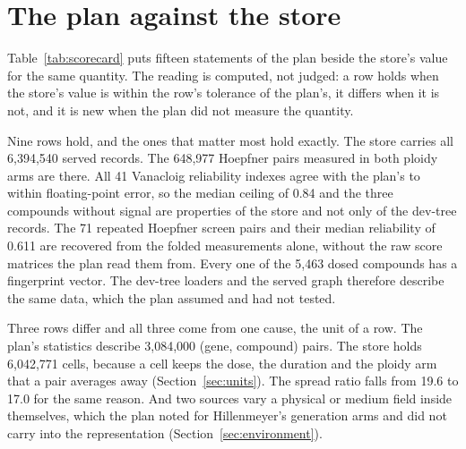 
\section{The plan against the store}
\label{sec:scorecard}

Table~\ref{tab:scorecard} puts fifteen statements of the plan beside the store's value for
the same quantity. The reading is computed, not judged: a row holds when the store's value
is within the row's tolerance of the plan's, it differs when it is not, and it is new when
the plan did not measure the quantity.

\begin{table}[htbp]
\centering
\footnotesize
\caption{The plan's statements against the built store. Counts are exact; the tolerance
is zero for counts, 2 percent for the ceiling and the reliability, 10 percent for the
spread ratio and 15 percent for the Vanacloig share. The plan's row count is the sum of
its four (gene, compound) pair counts.}
\label{tab:scorecard}

\end{table}

Nine rows hold, and the ones that matter most hold exactly. The store carries all
6{,}394{,}540 served records. The 648{,}977 Hoepfner pairs measured in both ploidy arms are
there. All 41 Vanacloig reliability indexes agree with the plan's to within floating-point
error, so the median ceiling of 0.84 and the three compounds without signal are properties
of the store and not only of the dev-tree records. The 71 repeated Hoepfner screen pairs
and their median reliability of 0.611 are recovered from the folded measurements alone,
without the raw score matrices the plan read them from. Every one of the 5{,}463 dosed
compounds has a fingerprint vector. The dev-tree loaders and the served graph therefore
describe the same data, which the plan assumed and had not tested.

Three rows differ and all three come from one cause, the unit of a row. The plan's
statistics describe 3{,}084{,}000 (gene, compound) pairs. The store holds 6{,}042{,}771
cells, because a cell keeps the dose, the duration and the ploidy arm that a pair averages
away (Section~\ref{sec:units}). The spread ratio falls from 19.6 to 17.0 for the same
reason. And two sources vary a physical or medium field inside themselves, which the plan
noted for Hillenmeyer's generation arms and did not carry into the representation
(Section~\ref{sec:environment}).

